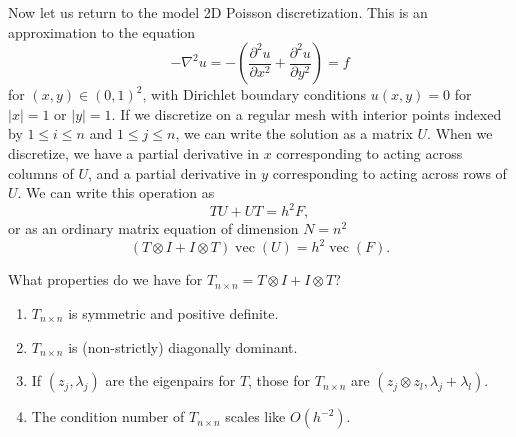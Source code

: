 Now let us return to the model 2D Poisson discretization.  This is an
approximation to the equation
\[
  -\nabla^2 u =
  -\left(
  \frac{\partial^2 u}{\partial x^2}+
  \frac{\partial^2 u}{\partial y^2} \right)
  = f
\]
for $(x,y) \in (0,1)^2$, with Dirichlet boundary conditions $u(x,y) =
0$ for $|x| = 1$ or $|y| = 1$.  If we discretize on a regular mesh with
interior points indexed by $1 \leq i \leq n$ and $1 \leq j \leq n$,
we can write the solution as a matrix $U$.  When we discretize, we
have a partial derivative in $x$ corresponding to acting across
columns of $U$, and a partial derivative in $y$ corresponding to
acting across rows of $U$.  We can write this operation as
\[
  TU + UT = h^2 F,
\]
or as an ordinary matrix equation of dimension $N = n^2$
\[
  (T \otimes I + I \otimes T) \operatorname{vec}(U) = h^2 \operatorname{vec}(F).
\]

What properties do we have for $T_{n \times n} = T \otimes I + I
\otimes T$?
\begin{enumerate}
\item
  $T_{n \times n}$ is symmetric and positive definite.
\item
  $T_{n \times n}$ is (non-strictly) diagonally dominant.
\item
  If $(z_j, \lambda_j)$ are the eigenpairs for $T$, those for
  $T_{n \times n}$ are $(z_j \otimes z_l, \lambda_j+\lambda_l)$.
\item
  The condition number of $T_{n \times n}$ scales like $O(h^{-2})$.
\end{enumerate}
